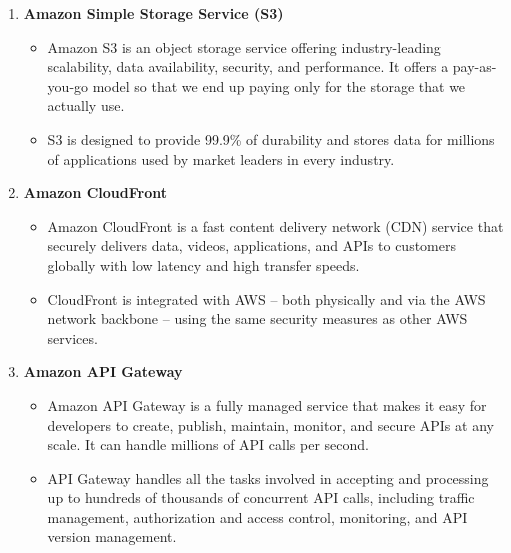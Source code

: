 \documentclass{article}
\begin{document}
\begin{enumerate}
\begin{itemize}
    \end{itemize}
    \item \textbf{Amazon Simple Storage Service (S3)}
    \begin{itemize}
        \item Amazon S3 \cite{s3} is an object storage service offering industry-leading scalability, data availability, security, and performance. It offers a pay-as-you-go model so that we end up paying only for the storage that we actually use. 
        \item S3 is designed to provide 99.9\% of durability and stores data for millions of applications used by market leaders in every industry.
    \end{itemize}
    \item \textbf{Amazon CloudFront}
    \begin{itemize}
        \item Amazon CloudFront \cite{cloudfront} is a fast content delivery network (CDN) service that securely delivers data, videos, applications, and APIs to customers globally with low latency and high transfer speeds.
        \item CloudFront is integrated with AWS – both physically and via the AWS network backbone – using the same security measures as other AWS services.
    \end{itemize}
    \newpage
    \item \textbf{Amazon API Gateway}
    \begin{itemize}
        \item Amazon API Gateway is a fully managed service that makes it easy for developers to create, publish, maintain, monitor, and secure APIs at any scale. It can handle millions of API calls per second.
        \item API Gateway \cite{apigateway} handles all the tasks involved in accepting and processing up to hundreds of thousands of concurrent API calls, including traffic management, authorization and access control, monitoring, and API version management.
        

\end{itemize}
\end{enumerate}
\end{document}
